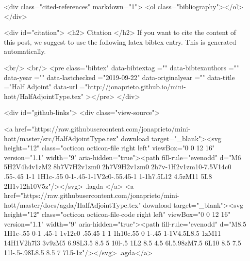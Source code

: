   <div class="cited-references" markdown="1">
  <ol class="bibliography"></ol>
  </div>


  
  <div id="citation">
  <h2> Citation </h2>
  If you want to cite the content of this post,
  we suggest to use the following latex bibtex entry.
  This is generated automatically.

  <br/>
  <br/>
  <pre class="bibtex"
       data-bibtextag =""
       data-bibtexauthors =""
       data-year =""
       data-lastchecked ="2019-09-22"
       data-originalyear =""
       data-title ="Half Adjoint"
       data-url ="http://jonaprieto.github.io/mini-hott/HalfAdjointType.tex"
  ></pre>
  </div>
  

  <div id="github-links">
    <div class="view-source">
      
        <a href="https://raw.githubusercontent.com/jonaprieto/mini-hott/master/src/HalfAdjointType.tex" download target="_blank"><svg height="12" class="octicon octicon-file right left" viewBox="0 0 12 16" version="1.1" width="9" aria-hidden="true"><path fill-rule="evenodd" d="M6 5H2V4h4v1zM2 8h7V7H2v1zm0 2h7V9H2v1zm0 2h7v-1H2v1zm10-7.5V14c0 .55-.45 1-1 1H1c-.55 0-1-.45-1-1V2c0-.55.45-1 1-1h7.5L12 4.5zM11 5L8 2H1v12h10V5z"/></svg> .lagda </a>
        <a href="https://raw.githubusercontent.com/jonaprieto/mini-hott/master/docs/agda/HalfAdjointType.tex" download target="_blank"><svg height="12" class="octicon octicon-file-code right left" viewBox="0 0 12 16" version="1.1" width="9" aria-hidden="true"><path fill-rule="evenodd" d="M8.5 1H1c-.55 0-1 .45-1 1v12c0 .55.45 1 1 1h10c.55 0 1-.45 1-1V4.5L8.5 1zM11 14H1V2h7l3 3v9zM5 6.98L3.5 8.5 5 10l-.5 1L2 8.5 4.5 6l.5.98zM7.5 6L10 8.5 7.5 11l-.5-.98L8.5 8.5 7 7l.5-1z"/></svg> .agda</a>
      

